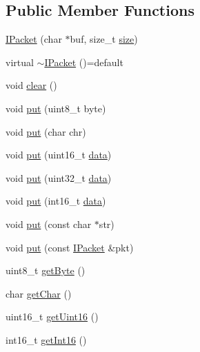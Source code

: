 \subsection*{Public Member Functions}
\begin{DoxyCompactItemize}
\item 
\hyperlink{classTiny_1_1IPacket_af44b18c4c8481475d40d8b87a6cb38ff}{I\+Packet} (char $\ast$buf, size\+\_\+t \hyperlink{classTiny_1_1IPacket_a76b6389f0d47b67c8428c58c2b09df51}{size})
\item 
virtual \hyperlink{classTiny_1_1IPacket_a187fce5726b428db3a36e62522472c5b}{$\sim$\+I\+Packet} ()=default
\item 
void \hyperlink{classTiny_1_1IPacket_a6cc28c5235de6a9ce68bea546a4db17c}{clear} ()
\item 
void \hyperlink{classTiny_1_1IPacket_a9d5ba62a453b9cd364c0e214c245f11d}{put} (uint8\+\_\+t byte)
\item 
void \hyperlink{classTiny_1_1IPacket_a9dd0344bbed4500af63a3f700d31945b}{put} (char chr)
\item 
void \hyperlink{classTiny_1_1IPacket_a4dd6118251a5557691e4ed358a3b2ddc}{put} (uint16\+\_\+t \hyperlink{classTiny_1_1IPacket_aedf2ba31c5a29e3829458bd9f03a7051}{data})
\item 
void \hyperlink{classTiny_1_1IPacket_a5ec37c88a536d710fb1561cd62f52c91}{put} (uint32\+\_\+t \hyperlink{classTiny_1_1IPacket_aedf2ba31c5a29e3829458bd9f03a7051}{data})
\item 
void \hyperlink{classTiny_1_1IPacket_abf21aef6652da2e975c8be13e6a643e9}{put} (int16\+\_\+t \hyperlink{classTiny_1_1IPacket_aedf2ba31c5a29e3829458bd9f03a7051}{data})
\item 
void \hyperlink{classTiny_1_1IPacket_a46eaf3eb0232288dfb36ce7cc01b12e5}{put} (const char $\ast$str)
\item 
void \hyperlink{classTiny_1_1IPacket_a5ebc1e6507e7255a8babddbae82dcb2a}{put} (const \hyperlink{classTiny_1_1IPacket}{I\+Packet} \&pkt)
\item 
uint8\+\_\+t \hyperlink{classTiny_1_1IPacket_ac3088a86a37df4d08d0f6ca961abf006}{get\+Byte} ()
\item 
char \hyperlink{classTiny_1_1IPacket_a0fea05a806c533be32c68bb3899bd596}{get\+Char} ()
\item 
uint16\+\_\+t \hyperlink{classTiny_1_1IPacket_a345d5d5791d5929c9a5f9bb2763f99a5}{get\+Uint16} ()
\item 
int16\+\_\+t \hyperlink{classTiny_1_1IPacket_a9fd3b560b1f34e5d4c3e4a856bddc293}{get\+Int16} ()
\item 

\end{DoxyCompactItemize}

